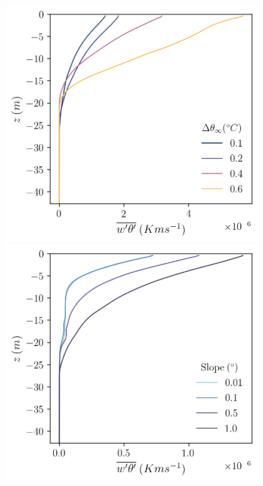\documentclass[draft]{agujournal2019}
\begin{document}
\begin{figure}[h!]
    \centering
    \begin{minipage}{0.5\textwidth}
        \includegraphics[trim={0 0 0 0},clip,width=\textwidth]{Figures/heatflux_cmp_dT_43h_tav13h_z_profile.png}
    \end{minipage}%
    \begin{minipage}{0.5\textwidth}
        \includegraphics[trim={0 0 0 0},clip,width=\textwidth]{Figures/heatflux_cmp_dslope_43h_tav13h_z_profile.png}

\end{minipage}
\end{figure}
\end{document}
